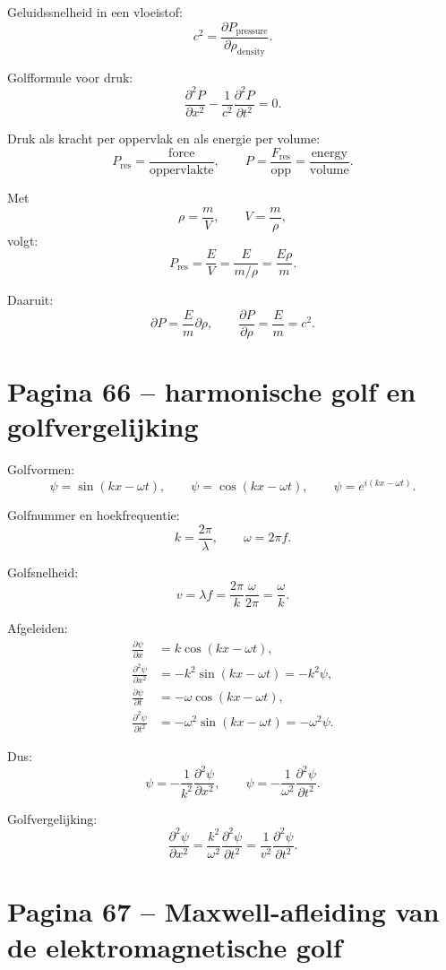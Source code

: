\documentclass[11pt,a4paper]{article}
\begin{document}
Geluidssnelheid in een vloeistof:
$$
c^2
=
\frac{\partial P_{\mathrm{pressure}}}{\partial \rho_{\mathrm{density}}}.
$$

Golfformule voor druk:
$$
\frac{\partial^2P}{\partial x^2}
-
\frac{1}{c^2}
\frac{\partial^2P}{\partial t^2}
=
0.
$$

Druk als kracht per oppervlak en als energie per volume:
$$
P_{\mathrm{res}}
=
\frac{\mathrm{force}}{\mathrm{oppervlakte}},
\qquad
P=
\frac{F_{\mathrm{res}}}{\mathrm{opp}}
=
\frac{\mathrm{energy}}{\mathrm{volume}}.
$$

Met
$$
\rho=\frac{m}{V},
\qquad
V=\frac{m}{\rho},
$$
volgt:
$$
P_{\mathrm{res}}
=
\frac{E}{V}
=
\frac{E}{m/\rho}
=
\frac{E\rho}{m}.
$$

Daaruit:
$$
\partial P=\frac{E}{m}\partial\rho,
\qquad
\frac{\partial P}{\partial\rho}
=
\frac{E}{m}
=
c^{2}.
$$

\section*{Pagina 66 -- harmonische golf en golfvergelijking}

Golfvormen:
$$
\psi=\sin(kx-\omega t),
\qquad
\psi=\cos(kx-\omega t),
\qquad
\psi=e^{i(kx-\omega t)}.
$$

Golfnummer en hoekfrequentie:
$$
k=\frac{2\pi}{\lambda},
\qquad
\omega=2\pi f.
$$

Golfsnelheid:
$$
v=\lambda f
=
\frac{2\pi}{k}\frac{\omega}{2\pi}
=
\frac{\omega}{k}.
$$

Afgeleiden:
\begin{align*}
\frac{\partial\psi}{\partial x}
&=
k\cos(kx-\omega t),\\
\frac{\partial^{2}\psi}{\partial x^{2}}
&=
-k^{2}\sin(kx-\omega t)
=
-k^{2}\psi,\\
\frac{\partial\psi}{\partial t}
&=
-\omega\cos(kx-\omega t),\\
\frac{\partial^{2}\psi}{\partial t^{2}}
&=
-\omega^{2}\sin(kx-\omega t)
=
-\omega^{2}\psi.
\end{align*}

Dus:
$$
\psi
=
-\frac{1}{k^{2}}
\frac{\partial^{2}\psi}{\partial x^{2}},
\qquad
\psi
=
-\frac{1}{\omega^{2}}
\frac{\partial^{2}\psi}{\partial t^{2}}.
$$

Golfvergelijking:
$$
\frac{\partial^{2}\psi}{\partial x^{2}}
=
\frac{k^{2}}{\omega^{2}}
\frac{\partial^{2}\psi}{\partial t^{2}}
=
\frac{1}{v^{2}}
\frac{\partial^{2}\psi}{\partial t^{2}}.
$$

\section*{Pagina 67 -- Maxwell-afleiding van de elektromagnetische golf}
\end{document}
